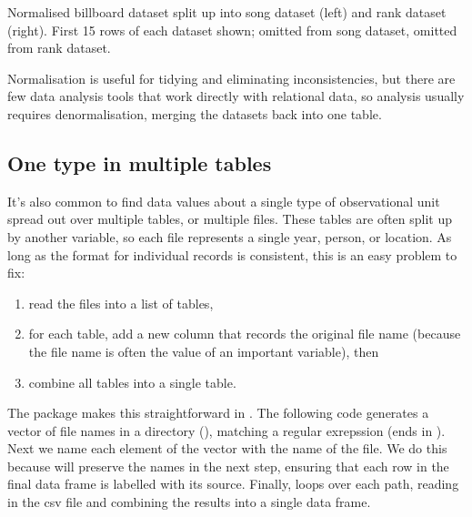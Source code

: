 \documentclass[article]{jss}
\begin{document}
\begin{table}
  \centering
  \hspace{1em}%
  

  \caption{Normalised billboard dataset split up into song dataset (left) and rank dataset (right). First 15 rows of each dataset shown;  omitted from song dataset,  omitted from rank dataset.}
  \label{tbl:billboard-normal}
\end{table}

Normalisation is useful for tidying and eliminating inconsistencies, but there are few data analysis tools that work directly with relational data, so analysis usually requires denormalisation, merging the datasets back into one table. 


\subsection{One type in multiple tables}

It's also common to find data values about a single type of observational unit spread out over multiple tables, or multiple files. These tables are often split up by another variable, so each file represents a single year, person, or location. As long as the format for individual records is consistent, this is an easy problem to fix: 

\begin{enumerate}
  \item read the files into a list of tables,

\item for each table, add a new column that records the original file name (because the file name is often the value of an important variable), then

  \item combine all tables into a single table. 
\end{enumerate}

The  package makes this straightforward in . The following code generates a vector of file names in a directory (), matching a regular exrepssion (ends in ). Next we name each element of the vector with the name of the file. We do this because  will preserve the names in the next step, ensuring that each row in the final data frame is labelled with its source. Finally,  loops over each path, reading in the csv file and combining the results into a single data frame.
\end{document}
